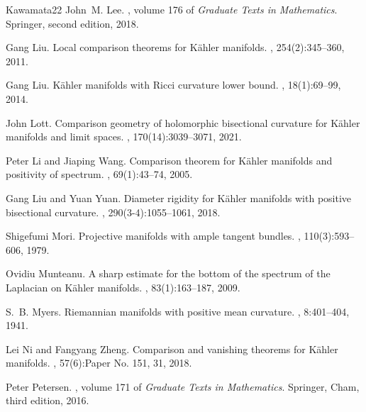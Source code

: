 \documentclass[12pt,reqno]{amsart}
\theoremstyle{plain}
\theoremstyle{definition}
\renewcommand{\>}{\rightarrow}
\numberwithin{equation}{section} %
\begin{document}
\begin{thebibliography}{Kawamata22}
    John~M. Lee.
    , volume 176 of {\em Graduate Texts in Mathematics}.
    \newblock Springer,  second edition, 2018.


    Gang Liu.
    \newblock Local comparison theorems for {K}\"ahler manifolds.
    , 254(2):345--360, 2011.

    Gang Liu.
    \newblock K\"ahler manifolds with {R}icci curvature lower bound.
    , 18(1):69--99, 2014.

    John Lott.
    \newblock Comparison geometry of holomorphic bisectional curvature for {K}\"ahler manifolds and limit spaces.
    , 170(14):3039--3071, 2021.

    Peter Li and Jiaping Wang.
    \newblock Comparison theorem for {K}\"ahler manifolds and positivity of spectrum.
    , 69(1):43--74, 2005.

    Gang Liu and Yuan Yuan.
    \newblock Diameter rigidity for {K}\"ahler manifolds with positive bisectional curvature.
    , 290(3-4):1055--1061, 2018.








    Shigefumi Mori.
    \newblock Projective manifolds with ample tangent bundles.
    , 110(3):593--606, 1979.

    Ovidiu Munteanu.
    \newblock A sharp estimate for the bottom of the spectrum of the {L}aplacian on {K}\"ahler manifolds.
    , 83(1):163--187, 2009.

    S.~B. Myers.
    \newblock Riemannian manifolds with positive mean curvature.
    , 8:401--404, 1941.



    Lei Ni and Fangyang Zheng.
    \newblock Comparison and vanishing theorems for {K}\"ahler manifolds.
    , 57(6):Paper No. 151, 31, 2018.




    Peter Petersen.
    , volume 171 of {\em Graduate Texts in Mathematics}.
    \newblock Springer, Cham, third edition, 2016.




\end{thebibliography}
\end{document}
